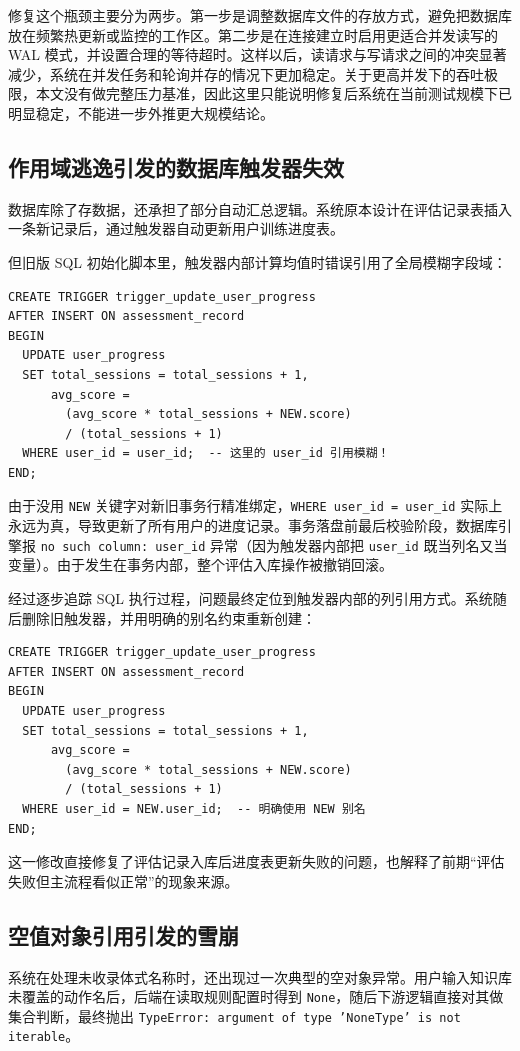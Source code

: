 \documentclass[UTF8,twoside]{ctexrep}
\makeatletter
\def@NAT@last@yr{\@citea}%
\def@NAT@last@yr{-\NAT@penalty}%
\makeatother
\begin{document}
修复这个瓶颈主要分为两步。第一步是调整数据库文件的存放方式，避免把数据库放在频繁热更新或监控的工作区。第二步是在连接建立时启用更适合并发读写的 WAL 模式，并设置合理的等待超时。这样以后，读请求与写请求之间的冲突显著减少，系统在并发任务和轮询并存的情况下更加稳定。关于更高并发下的吞吐极限，本文没有做完整压力基准，因此这里只能说明修复后系统在当前测试规模下已明显稳定，不能进一步外推更大规模结论。

\subsection{作用域逃逸引发的数据库触发器失效}
数据库除了存数据，还承担了部分自动汇总逻辑。系统原本设计在评估记录表插入一条新记录后，通过触发器自动更新用户训练进度表。

但旧版 SQL 初始化脚本里，触发器内部计算均值时错误引用了全局模糊字段域：
\begin{verbatim}
CREATE TRIGGER trigger_update_user_progress
AFTER INSERT ON assessment_record
BEGIN
  UPDATE user_progress 
  SET total_sessions = total_sessions + 1,
      avg_score =
        (avg_score * total_sessions + NEW.score)
        / (total_sessions + 1)
  WHERE user_id = user_id;  -- 这里的 user_id 引用模糊！
END;
\end{verbatim}
由于没用 \texttt{NEW} 关键字对新旧事务行精准绑定，\texttt{WHERE user\_id = user\_id} 实际上永远为真，导致更新了所有用户的进度记录。事务落盘前最后校验阶段，数据库引擎报 \texttt{no such column: user\_id} 异常（因为触发器内部把 \texttt{user\_id} 既当列名又当变量）。由于发生在事务内部，整个评估入库操作被撤销回滚。

经过逐步追踪 SQL 执行过程，问题最终定位到触发器内部的列引用方式。系统随后删除旧触发器，并用明确的别名约束重新创建：
\begin{verbatim}
CREATE TRIGGER trigger_update_user_progress
AFTER INSERT ON assessment_record
BEGIN
  UPDATE user_progress 
  SET total_sessions = total_sessions + 1,
      avg_score =
        (avg_score * total_sessions + NEW.score)
        / (total_sessions + 1)
  WHERE user_id = NEW.user_id;  -- 明确使用 NEW 别名
END;
\end{verbatim}
这一修改直接修复了评估记录入库后进度表更新失败的问题，也解释了前期“评估失败但主流程看似正常”的现象来源。

\subsection{空值对象引用引发的雪崩}
系统在处理未收录体式名称时，还出现过一次典型的空对象异常。用户输入知识库未覆盖的动作名后，后端在读取规则配置时得到 \texttt{None}，随后下游逻辑直接对其做集合判断，最终抛出 \texttt{TypeError: argument of type 'NoneType' is not iterable}。
\end{document}
